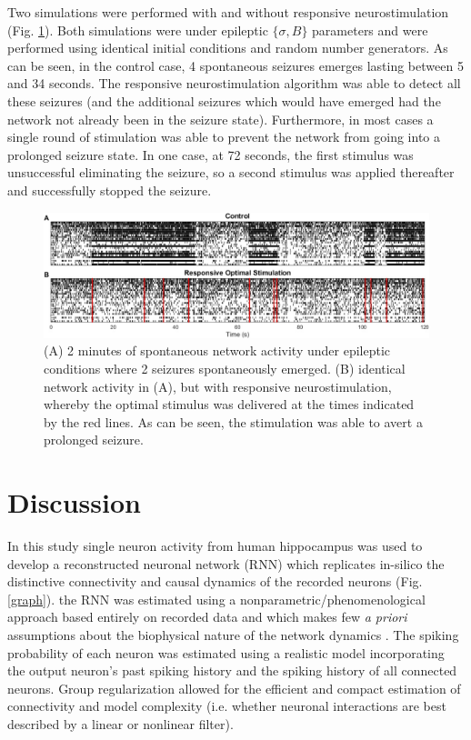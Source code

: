 \documentclass[11pt,a4paper,final]{article}
\begin{document}
Two simulations were performed with and without responsive neurostimulation (Fig. \ref{RS}).
Both simulations were under epileptic $\{\sigma,B\}$ parameters and were performed using identical initial conditions and random number generators.
As can be seen, in the control case, 4 spontaneous seizures emerges lasting between 5 and 34 seconds.
The responsive neurostimulation algorithm was able to detect all these seizures (and the additional seizures which would have emerged had the network not already been in the seizure state).
Furthermore, in most cases a single round of stimulation was able to prevent the network from going into a prolonged seizure state.
In one case, at 72 seconds, the first stimulus was unsuccessful eliminating the seizure, so a second stimulus was applied thereafter and successfully stopped the seizure.

\begin{figure}[!ht]
\centering
\includegraphics[width=180mm]{RS}
\caption[Responsive Stimulation]{
(A) 2 minutes of spontaneous network activity under epileptic conditions where 2 seizures spontaneously emerged.
(B) identical network activity in (A), but with responsive neurostimulation, whereby the optimal \len{} stimulus was delivered at the times indicated by the red lines. As can be seen, the stimulation was able to avert a prolonged seizure.}
\label{RS}
\end{figure}

\section{Discussion \label{disc}}

In this study single neuron activity from human hippocampus was used to develop a reconstructed neuronal network (RNN) which replicates in-silico the distinctive connectivity and causal dynamics of the recorded \nn{} neurons (Fig. \ref{graph}).
the RNN was estimated using a nonparametric/phenomenological approach based entirely on recorded data and which makes few \textit{a priori} assumptions about the biophysical nature of the network dynamics \citep{pillow08}.
The spiking probability of each neuron was estimated using a realistic model incorporating the output neuron's past spiking history and the spiking history of all connected neurons.
Group regularization allowed for the efficient and compact estimation of connectivity and model complexity (i.e. whether neuronal interactions are best described by a linear or nonlinear filter).
\end{document}
